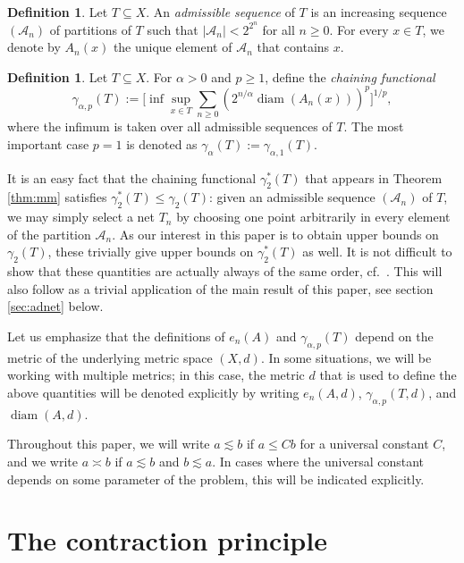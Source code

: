 \documentclass[10pt,reqno]{amsart}
\theoremstyle{definition}
\newtheorem{defn}[thm]{Definition}
\numberwithin{equation}{section}
\numberwithin{figure}{section}
\numberwithin{table}{section}
\newcommand{\diam}{\mathop{\mathrm{diam}}}
\begin{document}
\begin{defn}
Let $T\subseteq X$. An \emph{admissible sequence} of $T$ is an increasing 
sequence $(\mathcal{A}_n)$ of partitions of $T$ such that 
$|\mathcal{A}_n|<2^{2^n}$ for all $n\ge 0$. For every $x\in T$, we denote 
by $A_n(x)$ the unique element of $\mathcal{A}_n$ that contains $x$.
\end{defn}

\begin{defn}
Let $T\subseteq X$. For $\alpha>0$ and $p\ge 1$, define the 
\emph{chaining functional}
$$
	\gamma_{\alpha,p}(T) :=
	\Bigg[\inf \sup_{x\in T}\sum_{n\ge 0}(2^{n/\alpha}
	\diam(A_n(x)))^p\Bigg]^{1/p},
$$
where the infimum is taken over all admissible sequences of $T$. The most 
important case $p=1$ is denoted as
$\gamma_\alpha(T) := \gamma_{\alpha,1}(T)$.
\end{defn}

It is an easy fact that the chaining functional $\gamma_2^*(T)$ that 
appears in Theorem \ref{thm:mm} satisfies $\gamma_2^*(T)\le\gamma_2(T)$: 
given an admissible sequence $(\mathcal{A}_n)$ of $T$, we may simply 
select a net $T_n$ by choosing one point arbitrarily in every element of 
the partition $\mathcal{A}_n$. As our interest in this paper is to obtain 
upper bounds on $\gamma_2(T)$, these trivially give upper bounds on 
$\gamma_2^*(T)$ as well. It is not difficult to show that these quantities 
are actually always of the same order, cf.\ \cite[section 2.3]{Tal14}. 
This will also follow as a trivial application of the main result of 
this paper, see section \ref{sec:adnet} below.

Let us emphasize that the definitions of $e_n(A)$ and 
$\gamma_{\alpha,p}(T)$ depend on the metric of the underlying metric space 
$(X,d)$. In some situations, we will be working with multiple metrics; in 
this case, the metric $d$ that is used to define the above quantities will 
be denoted explicitly by writing $e_n(A,d)$, $\gamma_{\alpha,p}(T,d)$,
and $\diam(A,d)$.

Throughout this paper, we will write $a\lesssim b$ if $a\le Cb$ for a 
universal constant $C$, and we write $a\asymp b$ if $a\lesssim b$ and 
$b\lesssim a$. In cases where the universal constant depends on some 
parameter of the problem, this will be indicated explicitly.


\section{The contraction principle}
\label{sec:contract}
\end{document}

